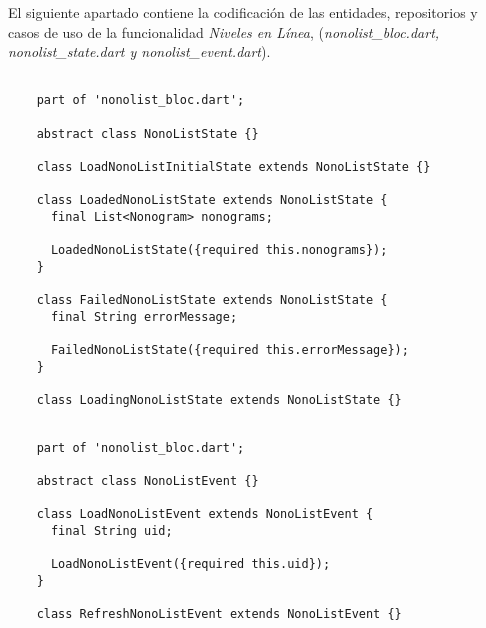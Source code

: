     \label{cap:anexo1-2}
    
    El siguiente apartado contiene la codificación de las entidades, repositorios y casos de uso de la 
    funcionalidad \textit{Niveles en Línea}, (\textit{nonolist\_bloc.dart, nonolist\_state.dart y nonolist\_event.dart}).
    
    \begin{lstlisting}
    
    part of 'nonolist_bloc.dart';

    abstract class NonoListState {}
    
    class LoadNonoListInitialState extends NonoListState {}
    
    class LoadedNonoListState extends NonoListState {
      final List<Nonogram> nonograms;
    
      LoadedNonoListState({required this.nonograms});
    }
    
    class FailedNonoListState extends NonoListState {
      final String errorMessage;
    
      FailedNonoListState({required this.errorMessage});
    }
    
    class LoadingNonoListState extends NonoListState {}
    \end{lstlisting}

    \begin{lstlisting}

    part of 'nonolist_bloc.dart';

    abstract class NonoListEvent {}
    
    class LoadNonoListEvent extends NonoListEvent {
      final String uid;
    
      LoadNonoListEvent({required this.uid});
    }
    
    class RefreshNonoListEvent extends NonoListEvent {}
    \end{lstlisting}

